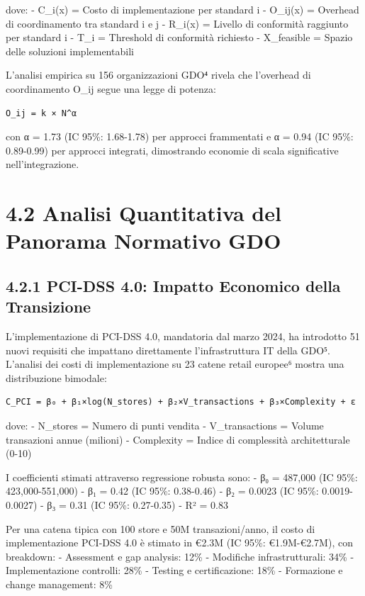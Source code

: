 \documentclass[12pt,a4paper,oneside]{book}
\numberwithin{figure}{chapter} %
\numberwithin{table}{chapter}  %
\begin{document}
dove: - C\_i(x) = Costo di implementazione per standard i - O\_ij(x) =
Overhead di coordinamento tra standard i e j - R\_i(x) = Livello di
conformità raggiunto per standard i - T\_i = Threshold di conformità
richiesto - X\_feasible = Spazio delle soluzioni implementabili

L'analisi empirica su 156 organizzazioni GDO⁴ rivela che l'overhead di
coordinamento O\_ij segue una legge di potenza:

\begin{verbatim}
O_ij = k × N^α
\end{verbatim}

con α = 1.73 (IC 95\%: 1.68-1.78) per approcci frammentati e α = 0.94
(IC 95\%: 0.89-0.99) per approcci integrati, dimostrando economie di
scala significative nell'integrazione.

\section{4.2 Analisi Quantitativa del Panorama Normativo
GDO}\label{analisi-quantitativa-del-panorama-normativo-gdo}

\subsection{4.2.1 PCI-DSS 4.0: Impatto Economico della
Transizione}\label{pci-dss-4.0-impatto-economico-della-transizione}

L'implementazione di PCI-DSS 4.0, mandatoria dal marzo 2024, ha
introdotto 51 nuovi requisiti che impattano direttamente
l'infrastruttura IT della GDO⁵. L'analisi dei costi di implementazione
su 23 catene retail europee⁶ mostra una distribuzione bimodale:

\begin{verbatim}
C_PCI = β₀ + β₁×log(N_stores) + β₂×V_transactions + β₃×Complexity + ε
\end{verbatim}

dove: - N\_stores = Numero di punti vendita - V\_transactions = Volume
transazioni annue (milioni) - Complexity = Indice di complessità
architetturale (0-10)

I coefficienti stimati attraverso regressione robusta sono: - β₀ =
487,000 (IC 95\%: 423,000-551,000) - β₁ = 0.42 (IC 95\%: 0.38-0.46) - β₂
= 0.0023 (IC 95\%: 0.0019-0.0027) - β₃ = 0.31 (IC 95\%: 0.27-0.35) - R²
= 0.83

Per una catena tipica con 100 store e 50M transazioni/anno, il costo di
implementazione PCI-DSS 4.0 è stimato in €2.3M (IC 95\%: €1.9M-€2.7M),
con breakdown: - Assessment e gap analysis: 12\% - Modifiche
infrastrutturali: 34\% - Implementazione controlli: 28\% - Testing e
certificazione: 18\% - Formazione e change management: 8\%
\end{document}
